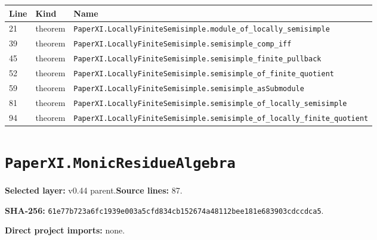 \documentclass[10pt,oneside]{book}
\begin{document}
\begin{longtable}{@{}p{}p{}p{}@{}}\toprule Line&Kind&Name\\\midrule\endhead

21&theorem&\nolinkurl{PaperXI.LocallyFiniteSemisimple.module_of_locally_semisimple}\\

39&theorem&\nolinkurl{PaperXI.LocallyFiniteSemisimple.semisimple_comp_iff}\\

45&theorem&\nolinkurl{PaperXI.LocallyFiniteSemisimple.semisimple_finite_pullback}\\

52&theorem&\nolinkurl{PaperXI.LocallyFiniteSemisimple.semisimple_of_finite_quotient}\\

59&theorem&\nolinkurl{PaperXI.LocallyFiniteSemisimple.semisimple_asSubmodule}\\

81&theorem&\nolinkurl{PaperXI.LocallyFiniteSemisimple.semisimple_of_locally_semisimple}\\

94&theorem&\nolinkurl{PaperXI.LocallyFiniteSemisimple.semisimple_of_locally_finite_quotient}\\

\bottomrule\end{longtable}

\section{\texorpdfstring{\nolinkurl{PaperXI.MonicResidueAlgebra}}{PaperXI.MonicResidueAlgebra}}\label{module:PaperXI.MonicResidueAlgebra}

\textbf{Selected layer:} v0.44 parent.\quad\textbf{Source lines:} 87.\par\textbf{SHA-256:} {\scriptsize\nolinkurl{61e77b723a6fc1939e003a5cfd834cb152674a48112bee181e683903cdccdca5}}.


\textbf{Direct project imports:} none.
\end{document}
